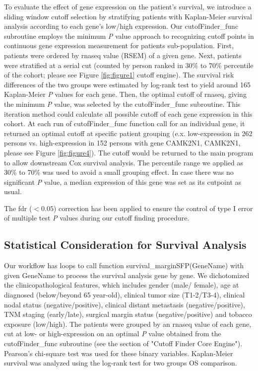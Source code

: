 \documentclass[jpm,article,submit,moreauthors,pdftex]{Definitions/mdpi}
\newenvironment{MyColorPar}[1]{%
    \leavevmode\color{#1}\ignorespaces%
}{%
}%
\begin{document}
\begin{paracol}{2}
To evaluate the effect of gene expression on the patient's survival, we introduce a sliding window cutoff selection by stratifying patients with Kaplan-Meier survival analysis according to each gene's low/high expression.
Our cutofFinder\_func subroutine employs the minimum \textit{P} value approach to recognizing cutoff points in continuous gene expression measurement for patients sub-population.
First, patients were ordered by \acrshort{rnaseq} value (RSEM) of a given gene. Next, patients were stratified at a serial cut (counted by person ranked in 30\% to 70\% percentile of the cohort; please see Figure \ref{fig:figure1} cutoff engine). The survival risk differences of the two groups were estimated by log-rank test to yield around 165 Kaplan-Meier \textit{P} values for each gene.
Then, the optimal cutoff of \acrshort{rnaseq}, giving the minimum \textit{P} value, was selected by the cutofFinder\_func subroutine.
This iteration method could calculate all possible cutoff of each gene expression in this cohort. At each run of cutofFinder\_func function call for an individual gene, it returned an optimal cutoff at specific patient grouping  (e.x. low-expression in 262 persons vs. high-expression in 152 persons with gene \acrlong{CAMK2N1}, \acrshort{CAMK2N1}, please see Figure \ref{fig:figure4}). The cutoff would be returned to the main program to allow downstream Cox survival analysis. The percentile range we applied as 30\% to 70\% was used to avoid a small grouping effect\cite{Miller1982}\cite{Mizuno2009a}.
In case there was no significant \textit{P} value, a median expression of this gene was set as its cutpoint as usual.
\begin{MyColorPar}{red}
The \acrfull{fdr} ($< 0.05$) correction has been applied to ensure the control of type I error of multiple test \textit{P} values during our cutoff finding procedure.
\end{MyColorPar}

\subsection{Statistical Consideration for Survival Analysis}

Our workflow has loops to call function survival\_marginSFP(GeneName) with given GeneName to process the survival analysis gene by gene.
We dichotomized the clinicopathological features, which includes gender (male/ female), age at diagnosed (below/beyond 65 year-old), clinical tumor size (T1-2/T3-4), clinical nodal status (negative/positive), clinical distant metastasis (negative/positive), TNM staging (early/late), surgical margin status (negative/positive) and tobacco exposure (low/high). The patients were grouped by an \acrshort{rnaseq} value of each gene, cut at low- or high-expression on an optimal \textit{P} value obtained from the cutofFinder\_func subroutine (see the section of "Cutoff Finder Core Engine"). Pearson's chi-square test was used for these binary variables. Kaplan-Meier survival was analyzed using the log-rank test for two groups OS comparison.


\end{paracol}
\end{document}
